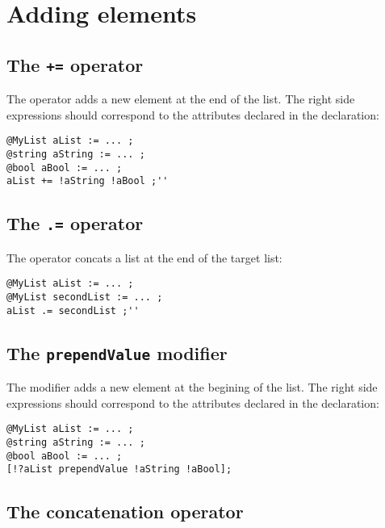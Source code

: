 \section{Adding elements}

\subsection{The \texttt{+=} operator}

The  \galgas{+=} operator adds a new element at the end of the list. The right side expressions should correspond to the attributes declared in the  declaration:\\

\begin{lstlisting}[language=galgas]
@MyList aList := ... ;
@string aString := ... ;
@bool aBool := ... ;
aList += !aString !aBool ;''
\end{lstlisting}


\subsection{The \texttt{.=} operator}

The  operator concats a list at the end of the target list:

\begin{lstlisting}[language=galgas]
@MyList aList := ... ;
@MyList secondList := ... ;
aList .= secondList ;''
\end{lstlisting}



\subsection{The \texttt{prependValue} modifier}

The  modifier adds a new element at the begining of the list. The right side expressions should correspond to the attributes declared in the   declaration:

\begin{lstlisting}[language=galgas]
@MyList aList := ... ;
@string aString := ... ;
@bool aBool := ... ;
[!?aList prependValue !aString !aBool];
\end{lstlisting}

\subsection{The concatenation operator}

